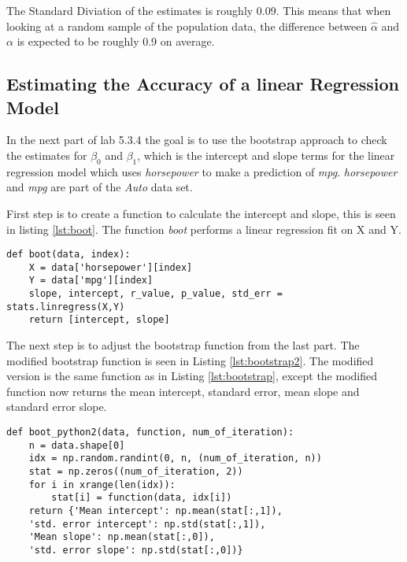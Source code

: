 The Standard Diviation of the estimates is roughly 0.09. This means that when looking at a random sample of the population data, the difference between $\hat{\alpha}$ and $\alpha$ is expected to be roughly 0.9 on average.


\subsection{Estimating the Accuracy of a linear Regression Model}

In the next part of lab 5.3.4 the goal is to use the bootstrap approach to check the estimates for $\beta_0$ and $\beta_1$, which is the intercept and slope terms for the linear regression model which uses \emph{horsepower} to make a prediction of \emph{mpg}. \emph{horsepower} and \emph{mpg} are part of the \emph{Auto} data set.

First step is to create a function to calculate the intercept and slope, this is seen in listing \ref{lst:boot}. The function \emph{boot} performs a linear regression fit on X and Y. 

\begin{lstlisting}[caption={Boot function in python}, label=lst:boot, mathescape=true]
def boot(data, index):
	X = data['horsepower'][index]
	Y = data['mpg'][index]
	slope, intercept, r_value, p_value, std_err = stats.linregress(X,Y)
	return [intercept, slope]
\end{lstlisting}

The next step is to adjust the bootstrap function from the last part. The modified bootstrap function is seen in Listing \ref{lst:bootstrap2}. The modified version is the same function as in Listing \ref{lst:bootstrap}, except the modified function now returns the mean intercept, standard error, mean slope and standard error slope.

\begin{lstlisting}[caption={Modified boot function in python}, label=lst:bootstrap2, mathescape=true]
def boot_python2(data, function, num_of_iteration):
	n = data.shape[0]
	idx = np.random.randint(0, n, (num_of_iteration, n))
	stat = np.zeros((num_of_iteration, 2))
	for i in xrange(len(idx)):
		stat[i] = function(data, idx[i])
	return {'Mean intercept': np.mean(stat[:,1]), 
	'std. error intercept': np.std(stat[:,1]), 
	'Mean slope': np.mean(stat[:,0]), 
	'std. error slope': np.std(stat[:,0])}
\end{lstlisting}

